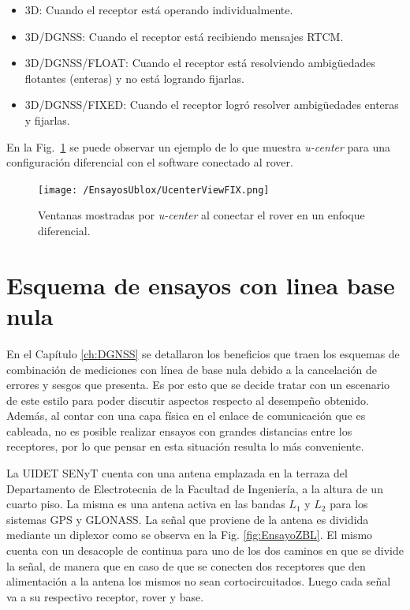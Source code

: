 \documentclass[a4paper,12pt,oneside,onecolumn,final,openright]{book}%
\begin{document}
\begin{itemize}
	\item 3D: Cuando el receptor está operando individualmente.
	\item 3D/DGNSS: Cuando el receptor está recibiendo mensajes RTCM.
	\item 3D/DGNSS/FLOAT: Cuando el receptor está resolviendo ambigüedades flotantes (enteras) y no está logrando fijarlas.
	\item 3D/DGNSS/FIXED: Cuando el receptor logró resolver ambigüedades enteras y fijarlas.
\end{itemize}
	En la Fig.~\ref{fig:ucenter} se puede observar un ejemplo de lo que muestra \textit{u-center} para una configuración diferencial con el software conectado al rover.
\begin{figure}
    \centering
    \texttt{[image: /EnsayosUblox/UcenterViewFIX.png]}
    \caption{Ventanas mostradas por \textit{u-center} al conectar el rover en un enfoque diferencial.}
    \label{fig:ucenter}
\end{figure}

\section{Esquema de ensayos con linea base nula}\label{sec:esquema_ZBL}
	En el Capítulo \ref{ch:DGNSS} se detallaron los beneficios que traen los esquemas de combinación de mediciones con línea de base nula debido a la cancelación de errores y sesgos que presenta. Es por esto que se decide tratar con un escenario de este estilo para poder discutir aspectos respecto al desempeño obtenido. Además, al contar con una capa física en el enlace de comunicación que es cableada, no es posible realizar ensayos con grandes distancias entre los receptores, por lo que pensar en esta situación resulta lo más conveniente.
	
	La UIDET SENyT cuenta con una antena emplazada en la terraza del Departamento de Electrotecnia de la Facultad de Ingeniería, a la altura de un cuarto piso. La misma es una antena activa en las bandas $L_1$ y $L_2$ para los sistemas GPS y GLONASS. La señal que proviene de la antena es dividida mediante un diplexor como se observa en la Fig. \ref{fig:EnsayoZBL}. El mismo cuenta con un desacople de continua para uno de los dos caminos en que se divide la señal, de manera que en caso de que se conecten dos receptores que den alimentación a la antena los mismos no sean cortocircuitados. Luego cada señal va a su respectivo receptor, rover y base. 
\end{document}
